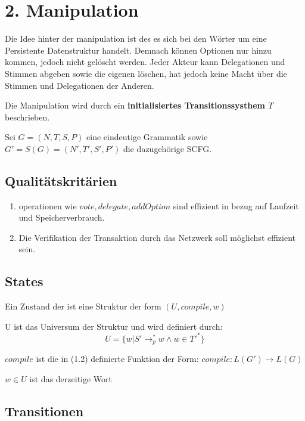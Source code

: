 \documentclass[]{article}
\begin{document}

\section{2. Manipulation}

Die Idee hinter der manipulation ist des es sich bei den Wörter um eine Persistente Datenstruktur handelt. Demnach können Optionen nur hinzu kommen, jedoch nicht gelöscht werden. Jeder Akteur kann Delegationen und Stimmen abgeben sowie
die eigenen löschen, hat jedoch keine Macht über die Stimmen und
Delegationen der Anderen.

Die Manipulation wird durch ein \textbf{initialisiertes Transitionssysthem $T$}
beschrieben.

Sei $G = (N,T,S,P)$ eine eindeutige Grammatik sowie
$G'=S(G)=(N',T',S',P')$ die dazugehörige SCFG.


\subsection{Qualitätskritärien}

\begin{enumerate}
  \item operationen wie $vote, delegate, addOption$ sind effizient in bezug auf Laufzeit und Speicherverbrauch.
  \item Die Verifikation der Transaktion durch das Netzwerk soll möglichst effizient sein.
\end{enumerate}

\subsection{States}

Ein Zustand der  ist eine Struktur der form $(U, compile, w)$

U ist das Universum der Struktur und wird definiert durch:
\[U=\{w\vert S'\rightarrow_p^* w \land w\in T'^*\}\]

$compile$ ist die in (1.2) definierte Funktion der Form:
$compile: L(G') \rightarrow L(G)$

$w\in U$ ist das derzeitige Wort

\subsection{Transitionen}
\end{document}
